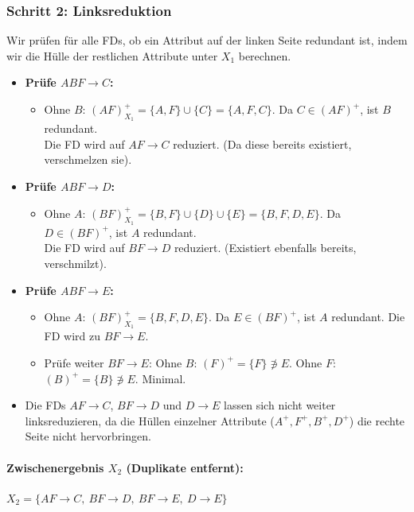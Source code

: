 \documentclass[12pt]{scrartcl}
\begin{document}
\subsubsection*{Schritt 2: Linksreduktion}
Wir prüfen für alle FDs, ob ein Attribut auf der linken Seite redundant ist, indem wir die Hülle der restlichen Attribute unter $X_1$ berechnen.
\begin{itemize}
    \item \textbf{Prüfe $ABF \rightarrow C$:}
    \begin{itemize}
        \item Ohne $B$: $(AF)^+_{X_1} = \{A, F\} \cup \{C\} = \{A, F, C\}$. Da $C \in (AF)^+$, ist $B$ redundant. \\
        Die FD wird auf $AF \rightarrow C$ reduziert. (Da diese bereits existiert, verschmelzen sie).
    \end{itemize}

    \item \textbf{Prüfe $ABF \rightarrow D$:}
    \begin{itemize}
        \item Ohne $A$: $(BF)^+_{X_1} = \{B, F\} \cup \{D\} \cup \{E\} = \{B, F, D, E\}$. Da $D \in (BF)^+$, ist $A$ redundant. \\
        Die FD wird auf $BF \rightarrow D$ reduziert. (Existiert ebenfalls bereits, verschmilzt).
    \end{itemize}

    \item \textbf{Prüfe $ABF \rightarrow E$:}
    \begin{itemize}
        \item Ohne $A$: $(BF)^+_{X_1} = \{B, F, D, E\}$. Da $E \in (BF)^+$, ist $A$ redundant. Die FD wird zu $BF \rightarrow E$.
        \item Prüfe weiter $BF \rightarrow E$: Ohne $B$: $(F)^+ = \{F\} \not\ni E$. Ohne $F$: $(B)^+ = \{B\} \not\ni E$. Minimal.
    \end{itemize}

    \item Die FDs $AF \rightarrow C$, $BF \rightarrow D$ und $D \rightarrow E$ lassen sich nicht weiter linksreduzieren, da die Hüllen einzelner Attribute ($A^+, F^+, B^+, D^+$) die rechte Seite nicht hervorbringen.
\end{itemize}
\paragraph{Zwischenergebnis $X_2$ (Duplikate entfernt):}
$X_2 = \{AF \rightarrow C,\ BF \rightarrow D,\ BF \rightarrow E,\ D \rightarrow E\}$
\end{document}

